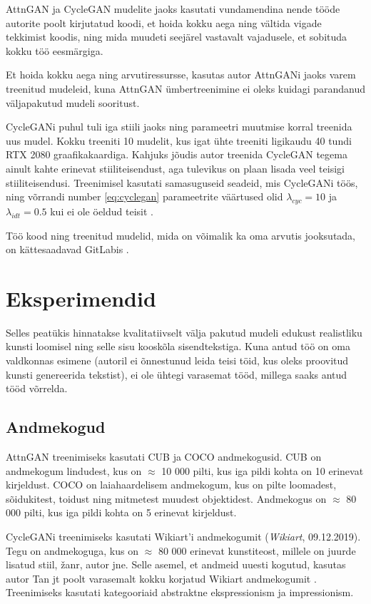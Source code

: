\documentclass{vilgym}
\begin{document}
	AttnGAN ja CycleGAN mudelite jaoks kasutati vundamendina nende tööde autorite poolt kirjutatud koodi, et hoida kokku aega ning vältida vigade tekkimist koodis, ning mida muudeti seejärel vastavalt vajadusele, et sobituda kokku töö eesmärgiga.

	Et hoida kokku aega ning arvutiressursse, kasutas autor AttnGANi jaoks varem treenitud mudeleid, kuna AttnGAN ümbertreenimine ei oleks kuidagi parandanud väljapakutud mudeli sooritust.

	CycleGANi puhul tuli iga stiili jaoks ning parameetri muutmise korral treenida uus mudel. Kokku treeniti 10 mudelit, kus igat ühte treeniti ligikaudu 40 tundi RTX 2080 graafikakaardiga. Kahjuks jõudis autor treenida CycleGAN tegema ainult kahte erinevat stiiliteisendust, aga tulevikus on plaan lisada veel teisigi stiiliteisendusi. Treenimisel kasutati samasuguseid seadeid, mis CycleGANi töös, ning võrrandi number \ref{eq:cyclegan} parameetrite väärtused olid $ \lambda_{cyc} = 10 $ ja $ \lambda_{idt} = 0.5 $ kui ei ole öeldud teisit \parencite{cyclegan}.

	Töö kood ning treenitud mudelid, mida on võimalik ka oma arvutis jooksutada, on kättesaadavad GitLabis \parencite{text2art-gan}.

	\section{Eksperimendid}
	Selles peatükis hinnatakse kvalitatiivselt välja pakutud mudeli edukust realistliku kunsti loomisel ning selle sisu kooskõla sisendtekstiga. Kuna antud töö on oma valdkonnas esimene (autoril ei õnnestunud leida teisi töid, kus oleks proovitud kunsti genereerida tekstist), ei ole ühtegi varasemat tööd, millega saaks antud tööd võrrelda.

	\subsection{Andmekogud}
	AttnGAN treenimiseks kasutati CUB \parencite{cub} ja COCO \parencite{srgan} andmekogusid. CUB on andmekogum lindudest, kus on $\approx$ 10 000 pilti, kus iga pildi kohta on 10 erinevat kirjeldust. COCO on laiahaardelisem andmekogum, kus on pilte loomadest, sõidukitest, toidust ning mitmetest muudest objektidest. Andmekogus on $\approx$ 80 000 pilti, kus iga pildi kohta on 5 erinevat kirjeldust.

	CycleGANi treenimiseks kasutati Wikiart'i andmekogumit (\textit{Wikiart}, 09.12.2019). Tegu on andmekoguga, kus on $\approx$ 80 000 erinevat kunstiteost, millele on juurde lisatud stiil, žanr, autor jne. Selle asemel, et andmeid uuesti kogutud, kasutas autor Tan jt poolt varasemalt kokku korjatud Wikiart andmekogumit \parencite{artgan}. Treenimiseks kasutati kategooriaid abstraktne ekspressionism ja impressionism.
\end{document}
